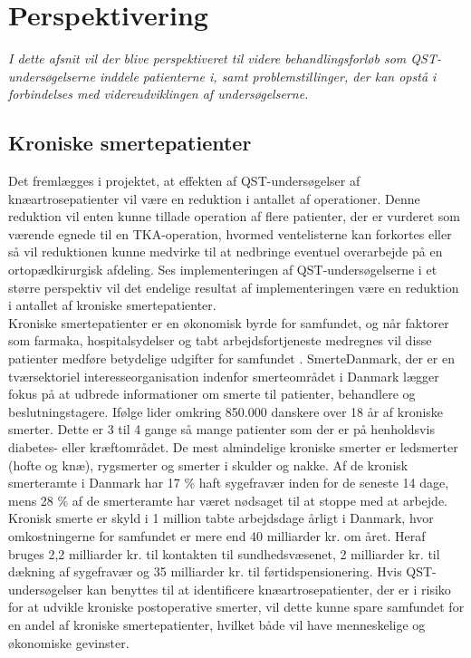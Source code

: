 \section{Perspektivering}\label{perspektivering}
\textit{I dette afsnit vil der blive perspektiveret til videre behandlingsforløb som QST-undersøgelserne inddele patienterne i, samt problemstillinger, der kan opstå i forbindelses med videreudviklingen af undersøgelserne.}
\subsection{Kroniske smertepatienter}
Det fremlægges i projektet, at effekten af QST-undersøgelser af knæartrosepatienter  vil være en reduktion i antallet af operationer. Denne reduktion vil enten kunne tillade operation af flere patienter, der er vurderet som værende egnede til  en TKA-operation, hvormed ventelisterne kan forkortes eller så vil reduktionen kunne medvirke til at nedbringe eventuel overarbejde på en ortopædkirurgisk afdeling. Ses implementeringen af QST-undersøgelserne i et større perspektiv vil det endelige resultat af implementeringen være en reduktion i antallet af kroniske smertepatienter. \\
Kroniske smertepatienter er en økonomisk byrde for samfundet, og når faktorer som farmaka, hospitalsydelser og tabt arbejdsfortjeneste medregnes vil disse patienter medføre betydelige udgifter for samfundet \citep{SmerteDanmark}. SmerteDanmark, der er en tværsektoriel interesseorganisation indenfor smerteområdet i Danmark lægger fokus på at udbrede informationer om smerte til patienter, behandlere og beslutningstagere. Ifølge  lider omkring 850.000 danskere over 18 år af kroniske smerter. Dette er 3 til 4 gange så mange patienter som der er på henholdsvis diabetes- eller kræftområdet. De mest almindelige kroniske smerter er ledsmerter (hofte og knæ), rygsmerter og smerter i skulder og nakke. Af de kronisk smerteramte i Danmark har 17 \% haft sygefravær inden for de seneste 14 dage, mens 28 \% af de smerteramte har været nødsaget til at stoppe med at arbejde. Kronisk smerte er skyld i 1 million tabte arbejdsdage årligt i Danmark, hvor omkostningerne for samfundet er mere end 40 milliarder kr. om året. \citep{SmerteDanmark} Heraf bruges 2,2 milliarder kr. til kontakten til sundhedsvæsenet, 2 milliarder kr. til dækning af sygefravær og 35 milliarder kr. til førtidspensionering. \citep{SmerteDanmark} Hvis QST-undersøgelser kan benyttes til at identificere knæartrosepatienter, der er i risiko for at udvikle kroniske postoperative smerter, vil dette kunne spare samfundet for en andel af kroniske smertepatienter, hvilket både vil have menneskelige og økonomiske gevinster.
